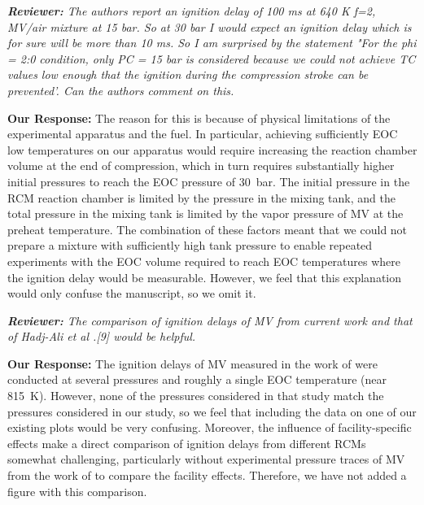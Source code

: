 \documentclass{article}
\newenvironment{reviewer}{\vspace{0.5\baselineskip}\begingroup\itshape\textbf{Reviewer:}}{\endgroup\vspace{0.5\baselineskip}}
\newenvironment{response}{\vspace{0.5\baselineskip}\textbf{Our Response:}}{\vspace{0.5\baselineskip}}
\begin{document}
\begin{reviewer}
    The authors report an ignition delay of 100 ms at 640 K f=2, MV/air mixture at 15 bar. So at 30
    bar I would expect an ignition delay which is for sure will be more than 10 ms. So I am
    surprised by the statement "For the phi = 2:0 condition, only  PC = 15 bar is considered because
    we could not achieve TC values low enough that the ignition during the compression stroke can be
    prevented'. Can the authors comment on this.
\end{reviewer}

\begin{response}
    The reason for this is because of physical limitations of the experimental apparatus and the
    fuel. In particular, achieving sufficiently EOC low temperatures on our apparatus would require
    increasing the reaction chamber volume at the end of compression, which in turn requires
    substantially higher initial pressures to reach the EOC pressure of \SI{30}{\bar}. The initial
    pressure in the RCM reaction chamber is limited by the pressure in the mixing tank, and the
    total pressure in the mixing tank is limited by the vapor pressure of MV at the preheat
    temperature. The combination of these factors meant that we could not prepare a mixture with
    sufficiently high tank pressure to enable repeated experiments with the EOC volume required to
    reach EOC temperatures where the ignition delay would be measurable. However, we feel that this
    explanation would only confuse the manuscript, so we omit it.
\end{response}

\begin{reviewer}
    The comparison of ignition delays of MV from current work and that of Hadj-Ali et al .[9] would
    be helpful.
\end{reviewer}

\begin{response}
    The ignition delays of MV measured in the work of \citet{Hadj-Ali2009} were conducted at several
    pressures and roughly a single EOC temperature (near \SI{815}{\K}). However, none of the
    pressures considered in that study match the pressures considered in our study, so we feel that
    including the data on one of our existing plots would be very confusing. Moreover, the influence
    of facility-specific effects make a direct comparison of ignition delays from different RCMs
    somewhat challenging, particularly without experimental pressure traces of MV from the work of
    \citet{Hadj-Ali2009} to compare the facility effects. Therefore, we have not added a figure with
    this comparison.
\end{response}
\end{document}

